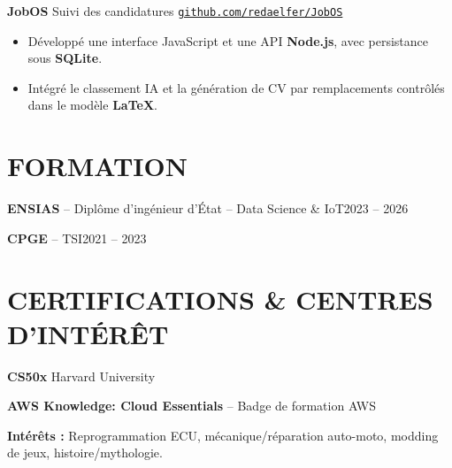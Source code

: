 \documentclass[11pt,a4paper]{article}
\newcommand{\entry}[2]{\noindent #1\hfill #2\par}
\newcommand{\jobgap}{\vspace{5pt}}
\begin{document}
\jobgap
\textbf{JobOS} \textbar{} Suivi des candidatures \textbar{} \href{https://github.com/redaelfer/JobOS}{\nolinkurl{github.com/redaelfer/JobOS}}\par
\begin{itemize}
  \item Développé une interface JavaScript et une API \textbf{Node.js}, avec persistance sous \textbf{SQLite}.
  \item Intégré le classement IA et la génération de CV par remplacements contrôlés dans le modèle \textbf{LaTeX}.
\end{itemize}

\section*{FORMATION}
\entry{\textbf{ENSIAS} -- Diplôme d'ingénieur d'État -- Data Science \& IoT}{2023 -- 2026}
\vspace{3pt}
\entry{\textbf{CPGE} -- TSI}{2021 -- 2023}

\section*{CERTIFICATIONS \& CENTRES D'INTÉRÊT}
\textbf{CS50x} \textbar{} Harvard University\par
\vspace{3pt}
\textbf{AWS Knowledge: Cloud Essentials} -- Badge de formation \textbar{} AWS\par

\vspace{5pt}
\textbf{Intérêts :} Reprogrammation ECU, mécanique/réparation auto-moto, modding de jeux, histoire/mythologie.
\end{document}
